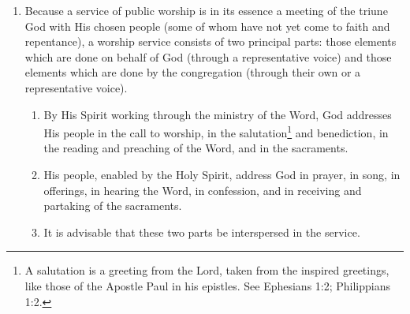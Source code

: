 \documentclass[
]{book}
\providecommand{\tightlist}{%
  \setlength{\itemsep}{0pt}\setlength{\parskip}{0pt}}
\begin{document}
\protect\hypertarget{chapter-slug-53-the-parts-of-public-worship}{\href{}{}}

\begin{enumerate}
\def\labelenumi{\arabic{enumi}.}
\tightlist
\item
  \protect\hypertarget{53}{\href{}{}}Because a service of public worship is in its essence a meeting of the triune God with His chosen people (some of whom have not yet come to faith and repentance), a worship service consists of two principal parts: those elements which are done on behalf of God (through a representative voice) and those elements which are done by the congregation (through their own or a representative voice).

  \begin{enumerate}
  \def\labelenumii{\alph{enumii}.}
  \tightlist
  \item
    By His Spirit working through the ministry of the Word, God addresses His people in the call to worship, in the salutation\footnote{A salutation is a greeting from the Lord, taken from the inspired greetings, like those of the Apostle Paul in his epistles. See Ephesians 1:2; Philippians 1:2.} and benediction, in the reading and preaching of the Word, and in the sacraments.
  \item
    His people, enabled by the Holy Spirit, address God in prayer, in song, in offerings, in hearing the Word, in confession, and in receiving and partaking of the sacraments.
  \item
    It is advisable that these two parts be interspersed in the service.
  \end{enumerate}
\end{enumerate}
\end{document}
